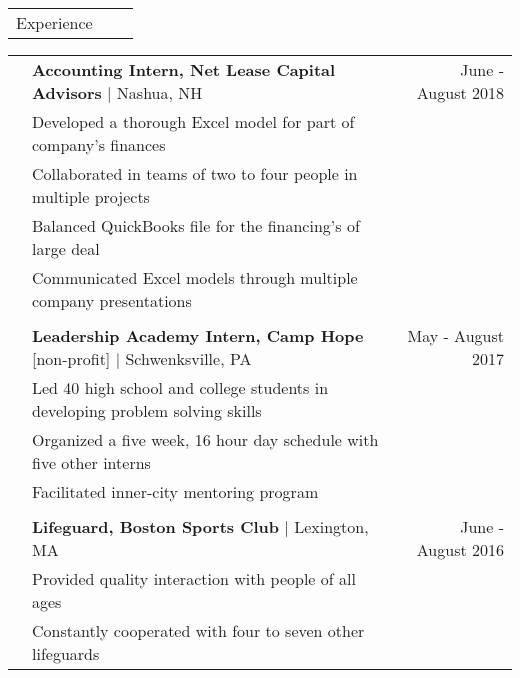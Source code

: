 \documentclass[letterpaper,10pt,oneside]{article}
\begin{document}
 \noindent \begin{tabularx}{\linewidth}{@{} l l R }
     \Large{Experience}\\
 \end{tabularx}     
 \noindent \begin{tabularx}{\linewidth}{@{} l l R }     
     & \textbf{Accounting Intern, Net Lease Capital Advisors} $\mid$ Nashua, NH & June - August 2018 \\
     &Developed a thorough Excel model for part of company's finances\\
     &Collaborated in teams of two to four people in multiple projects\\
     &Balanced QuickBooks file for the financing's of large deal\\
     &Communicated Excel models through multiple company presentations\\
     \\
     &\textbf{Leadership Academy Intern, Camp Hope} [non-profit] $\mid$ Schwenksville, PA & May - August 2017\\
     &Led 40 high school and college students in developing problem solving skills\\
     &Organized a five
week, 16 hour day schedule with five other interns\\
	&Facilitated inner-city mentoring program\\
     \\
     &\textbf{Lifeguard, Boston Sports Club} $\mid$ Lexington, MA & June - August 2016 \\
     &Provided quality interaction with people of all ages\\
     &Constantly cooperated with four to seven other lifeguards\\
 \end{tabularx}     
\end{document}
